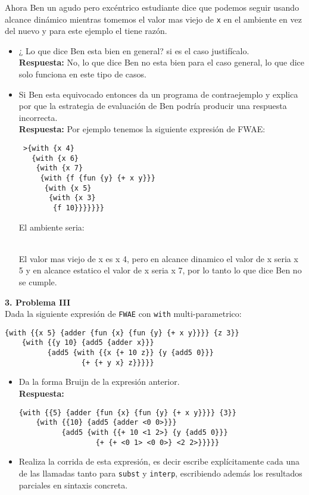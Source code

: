 \documentclass[letterpaper,11pt]{article}
\begin{document}
 Ahora Ben un agudo pero excéntrico estudiante dice que podemos seguir usando alcance dinámico mientras tomemos el valor mas viejo de \verb;x; en el ambiente en vez del nuevo y para este ejemplo el tiene razón.
 \begin{itemize}
 \item{¿ Lo que dice Ben esta bien en general? si es el caso justifícalo. }
 \\
 \textbf{Respuesta:} 
 No, lo que dice Ben no esta bien para el caso general, lo que dice solo funciona en este tipo de casos.
 \item{Si Ben esta equivocado entonces da un programa de contraejemplo y explica
 por que la estrategia de evaluación de Ben podría producir una respuesta incorrecta.}
 \\
 \textbf{Respuesta:} 
 Por ejemplo tenemos la siguiente expresión de FWAE:
\begin{verbatim}
 >{with {x 4}
   {with {x 6}
    {with {x 7}
     {with {f {fun {y} {+ x y}}}
      {with {x 5}
       {with {x 3}
        {f 10}}}}}}}
\end{verbatim}

El ambiente seria:
\\
\\
El valor mas viejo de x es x 4, pero en alcance dinamico el valor de x seria x 5 y en alcance estatico el valor de x seria x 7, por lo tanto lo que dice Ben no se cumple.

 \end{itemize}
 
 {\bf 3. Problema III}
 \\
Dada la siguiente expresión de \texttt{FWAE} con \verb;with; multi-parametrico:
\begin{verbatim}
{with {{x 5} {adder {fun {x} {fun {y} {+ x y}}}} {z 3}}
    {with {{y 10} {add5 {adder x}}}
          {add5 {with {{x {+ 10 z}} {y {add5 0}}}
                  {+ {+ y x} z}}}}}
\end{verbatim}
\begin{itemize}
\item Da la forma Bruijn de la expresión anterior.
\\
\textbf{Respuesta:} 
\begin{verbatim}
{with {{5} {adder {fun {x} {fun {y} {+ x y}}}} {3}}
    {with {{10} {add5 {adder <0 0>}}}
          {add5 {with {{+ 10 <1 2>} {y {add5 0}}}
                  {+ {+ <0 1> <0 0>} <2 2>}}}}}
\end{verbatim}
\item Realiza la corrida de esta expresión, es decir escribe explícitamente cada una de las llamadas tanto para \texttt{subst} y \texttt{interp}, escribiendo además los resultados parciales en sintaxis concreta.
\end{itemize}
\end{document}
